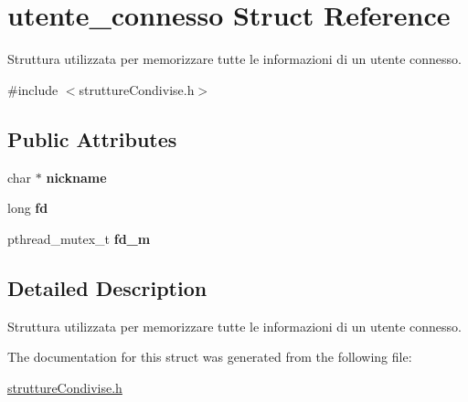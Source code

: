 \hypertarget{structutente__connesso}{}\section{utente\+\_\+connesso Struct Reference}
\label{structutente__connesso}


Struttura utilizzata per memorizzare tutte le informazioni di un utente connesso.  




{\ttfamily \#include $<$strutture\+Condivise.\+h$>$}

\subsection*{Public Attributes}
\begin{DoxyCompactItemize}
\item 
\mbox{\label{structutente__connesso_aea814d64e35f12cad5271e951a6bda28}} 
char $\ast$ {\bfseries nickname}
\item 
\mbox{\label{structutente__connesso_a26810342e07419af5d4b9408c1992db5}} 
long {\bfseries fd}
\item 
\mbox{\label{structutente__connesso_a6e98981da90837a6a36cbc6a0a56ee21}} 
pthread\+\_\+mutex\+\_\+t {\bfseries fd\+\_\+m}
\end{DoxyCompactItemize}


\subsection{Detailed Description}
Struttura utilizzata per memorizzare tutte le informazioni di un utente connesso. 

The documentation for this struct was generated from the following file\+:\begin{DoxyCompactItemize}
\item 
\hyperlink{struttureCondivise_8h}{strutture\+Condivise.\+h}\end{DoxyCompactItemize}
